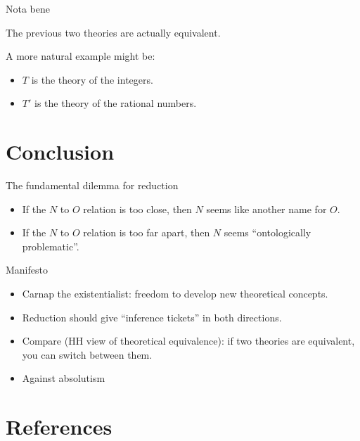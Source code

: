 \documentclass[fleqn]{beamer}
\begin{document}
\begin{frame}{Nota bene}

  The previous two theories are actually equivalent.

  A more natural example might be:

  \begin{itemize}
  \item $T$ is the theory of the integers.
  \item $T'$ is the theory of the rational numbers.
  \end{itemize}



\end{frame}




\section{Conclusion}




\begin{frame}{The fundamental dilemma for reduction}

  \begin{itemize}
  \item If the $N$ to $O$ relation is too close, then $N$ seems like
    another name for $O$.
  \item If the $N$ to $O$ relation is too far apart, then $N$ seems
    ``ontologically problematic''.
  \end{itemize}


\end{frame}


\begin{frame}{Manifesto}

  \begin{itemize}
  \item Carnap the existentialist: freedom to develop new theoretical
    concepts.
  \item Reduction should give ``inference tickets'' in both
    directions.
  \item Compare (HH view of theoretical equivalence): if two theories
    are equivalent, you can switch between them.
  \item Against absolutism
  \end{itemize}



\end{frame}

\section{References}
\end{document}
